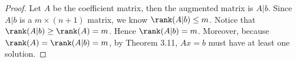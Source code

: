 \begin{Exercise}
\begin{proof}
Let $A$ be the coefficient matrix, then the augmented matrix is $A|b$. Since $A|b$ is a $m\times (n+1)$ matrix, we know $\rank(A|b) \leq m$. Notice that $\rank(A|b) \geq \rank(A) = m$. Hence $\rank(A|b) = m$. Moreover, because $\rank(A) = \rank(A|b) = m$, by Theorem 3.11, $Ax = b$ must have at least one solution.
\end{proof}
\end{Exercise}